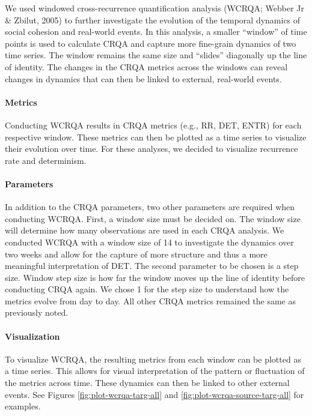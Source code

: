 \documentclass[english,man]{apa6}
\begin{document}
We used windowed cross-recurrence quantification analysis (WCRQA; Webber Jr \& Zbilut, 2005) to further investigate the evolution of the temporal dynamics of social cohesion and real-world events. In this analysis, a smaller \enquote{window} of time points is used to calculate CRQA and capture more fine-grain dynamics of two time series. The window remains the same size and \enquote{slides} diagonally up the line of identity. The changes in the CRQA metrics across the windows can reveal changes in dynamics that can then be linked to external, real-world events.

\hypertarget{metrics-1}{%
\paragraph{Metrics}\label{metrics-1}}

Conducting WCRQA results in CRQA metrics (e.g., RR, DET, ENTR) for each respective window. These metrics can then be plotted as a time series to visualize their evolution over time. For these analyses, we decided to visualize recurrence rate and determinism.

\hypertarget{parameters-1}{%
\paragraph{Parameters}\label{parameters-1}}

In addition to the CRQA parameters, two other parameters are required when conducting WCRQA. First, a window size must be decided on. The window size will determine how many observations are used in each CRQA analysis. We conducted WCRQA with a window size of 14 to investigate the dynamics over two weeks and allow for the capture of more structure and thus a more meaningful interpretation of DET. The second parameter to be chosen is a step size. Window step size is how far the window moves up the line of identity before conducting CRQA again. We chose 1 for the step size to understand how the metrics evolve from day to day. All other CRQA metrics remained the same as previously noted.

\hypertarget{visualization-1}{%
\paragraph{Visualization}\label{visualization-1}}

To visualize WCRQA, the resulting metrics from each window can be plotted as a time series. This allows for visual interpretation of the pattern or fluctuation of the metrics across time. These dynamics can then be linked to other external events. See Figures \ref{fig:plot-wcrqa-targ-all} and \ref{fig:plot-wcrqa-source-targ-all} for examples.
\end{document}
